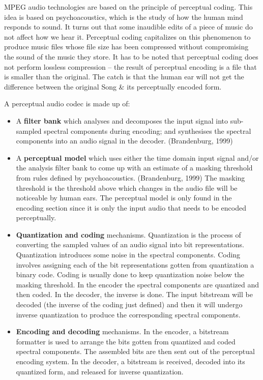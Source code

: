 \documentclass[12pt,svgnames,smaller]{article} %
\begin{document}
	MPEG audio technologies are based on the principle of perceptual coding. This idea is based on psychoacoustics, which is the study of how the human mind responds to sound. It turns out that some inaudible edits of a piece of music do not affect how we hear it. Perceptual coding capitalizes on this phenomenon to produce music files whose file size has been compressed without compromising the sound of the music they store. It has to be noted that perceptual coding does not perform lossless compression – the result of perceptual encoding is a file that is smaller than the original. The catch is that the human ear will not get the difference between the original Song \& its perceptually encoded form. 
	
	A perceptual audio codec is made up of:
	
	\begin{itemize}
		\item A \textbf{filter bank} which analyses and decomposes the input signal into sub-sampled spectral components during encoding; and synthesises the spectral components into an audio signal in the decoder. (Brandenburg, 1999)
		\item A \textbf{perceptual model} which uses either the time domain input signal and/or the analysis filter bank to come up with an estimate of a masking threshold from rules defined by psychoacoustics. (Brandenburg, 1999) The masking threshold is the threshold above which changes in the audio file will be noticeable by human ears. The perceptual model is only found in the encoding section since it is only the input audio that needs to be encoded perceptually.
		\item \textbf{Quantization and coding} mechanisms. Quantization is the process of converting the sampled values of an audio signal into bit representations. Quantization introduces some noise in the spectral components. Coding involves assigning each of the bit representations gotten from quantization a binary code. Coding is usually done to keep quantization noise below the masking threshold.   In the encoder the spectral components are quantized and then coded. In the decoder, the inverse is done. The input bitstream will be decoded (the inverse of the coding just defined) and then it will undergo inverse quantization to produce the corresponding spectral components.
		\item \textbf{Encoding and decoding} mechanisms. In the encoder, a bitstream formatter is used to arrange the bits gotten from quantized and coded spectral components.  The assembled bits are then sent out of the perceptual encoding system. In the decoder, a bitstream is received, decoded into its quantized form, and released for inverse quantization.
	\end{itemize}
	
\end{document}

